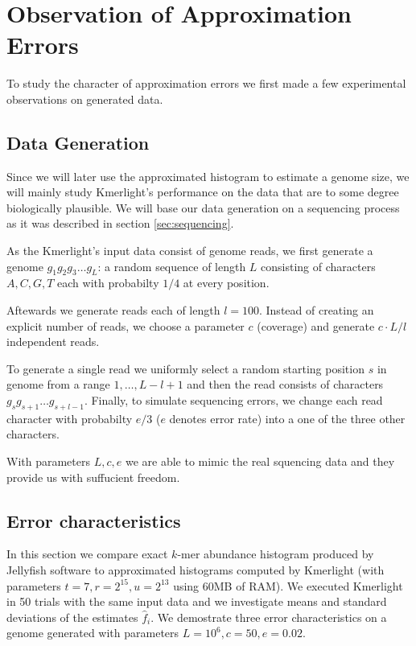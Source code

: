 \section{Observation of Approximation Errors}
To study the character of approximation errors we first made a few experimental
observations on generated data.

\subsection{Data Generation}
\label{sec:data-generation}
Since we will later use the approximated histogram to estimate a genome size, 
we will mainly study Kmerlight's performance on the data that are to some
degree biologically plausible. We will base our data generation on a sequencing
process as it was described in section \ref{sec:sequencing}.

As the Kmerlight's input data consist of genome reads, we first generate a genome $g_1g_2g_3 \dots g_L$:
a random sequence of length $L$ consisting of characters $A, C, G, T$ each with probabilty $1/4$ at every position.

Aftewards we generate reads each of length $l=100$. Instead of creating an explicit number of reads, we choose
a parameter $c$ (coverage) and generate $c \cdot L / l$ independent reads.

To generate a single read we uniformly select a random starting position $s$ in genome from a range $1, \dots, L - l + 1$
and then the read consists of characters $g_s g_{s+1} \dots g_{s+l-1}$. Finally, to simulate sequencing errors,
we change each read character with probabilty $e/3$ ($e$ denotes error rate) into a one of the three other characters.

With parameters $L, c, e$ we are able to mimic the real squencing data and they provide us with suffucient freedom.


\subsection{Error characteristics}

In this section we compare exact $k$-mer abundance histogram produced by Jellyfish software
to approximated histograms computed by Kmerlight (with parameters $t=7, r=2^{15}, u=2^{13}$ using 60MB of RAM).
We executed Kmerlight in 50 trials with the same input data and we investigate means and standard deviations of 
the estimates $\hat f_i$. We demostrate three error characteristics on a genome generated with parameters $L=10^6, c=50, e=0.02$.

